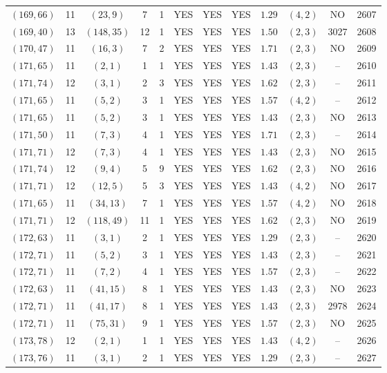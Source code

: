 \begin{longtable}{|c|c|c|c|c|c|c|c|c|c|c|c|}
$(169,66)$ & 11 & $(23,9)$ & 7 & 1 & YES & YES & YES & $1.29$ & $(4,2)$ & NO & 2607\\
$(169,40)$ & 13 & $(148,35)$ & 12 & 1 & YES & YES & YES & $1.50$ & $(2,3)$ & 3027 & 2608\\
$(170,47)$ & 11 & $(16,3)$ & 7 & 2 & YES & YES & YES & $1.71$ & $(2,3)$ & NO & 2609\\
$(171,65)$ & 11 & $(2,1)$ & 1 & 1 & YES & YES & YES & $1.43$ & $(2,3)$ & -- & 2610\\
$(171,74)$ & 12 & $(3,1)$ & 2 & 3 & YES & YES & YES & $1.62$ & $(2,3)$ & -- & 2611\\
$(171,65)$ & 11 & $(5,2)$ & 3 & 1 & YES & YES & YES & $1.57$ & $(4,2)$ & -- & 2612\\
$(171,65)$ & 11 & $(5,2)$ & 3 & 1 & YES & YES & YES & $1.43$ & $(2,3)$ & NO & 2613\\
$(171,50)$ & 11 & $(7,3)$ & 4 & 1 & YES & YES & YES & $1.71$ & $(2,3)$ & -- & 2614\\
$(171,71)$ & 12 & $(7,3)$ & 4 & 1 & YES & YES & YES & $1.43$ & $(2,3)$ & NO & 2615\\
$(171,74)$ & 12 & $(9,4)$ & 5 & 9 & YES & YES & YES & $1.62$ & $(2,3)$ & NO & 2616\\
$(171,71)$ & 12 & $(12,5)$ & 5 & 3 & YES & YES & YES & $1.43$ & $(4,2)$ & NO & 2617\\
$(171,65)$ & 11 & $(34,13)$ & 7 & 1 & YES & YES & YES & $1.57$ & $(4,2)$ & NO & 2618\\
$(171,71)$ & 12 & $(118,49)$ & 11 & 1 & YES & YES & YES & $1.62$ & $(2,3)$ & NO & 2619\\
$(172,63)$ & 11 & $(3,1)$ & 2 & 1 & YES & YES & YES & $1.29$ & $(2,3)$ & -- & 2620\\
$(172,71)$ & 11 & $(5,2)$ & 3 & 1 & YES & YES & YES & $1.43$ & $(2,3)$ & -- & 2621\\
$(172,71)$ & 11 & $(7,2)$ & 4 & 1 & YES & YES & YES & $1.57$ & $(2,3)$ & -- & 2622\\
$(172,63)$ & 11 & $(41,15)$ & 8 & 1 & YES & YES & YES & $1.43$ & $(2,3)$ & NO & 2623\\
$(172,71)$ & 11 & $(41,17)$ & 8 & 1 & YES & YES & YES & $1.43$ & $(2,3)$ & 2978 & 2624\\
$(172,71)$ & 11 & $(75,31)$ & 9 & 1 & YES & YES & YES & $1.57$ & $(2,3)$ & NO & 2625\\
$(173,78)$ & 12 & $(2,1)$ & 1 & 1 & YES & YES & YES & $1.43$ & $(4,2)$ & -- & 2626\\
$(173,76)$ & 11 & $(3,1)$ & 2 & 1 & YES & YES & YES & $1.29$ & $(2,3)$ & -- & 2627\\

\end{longtable}
